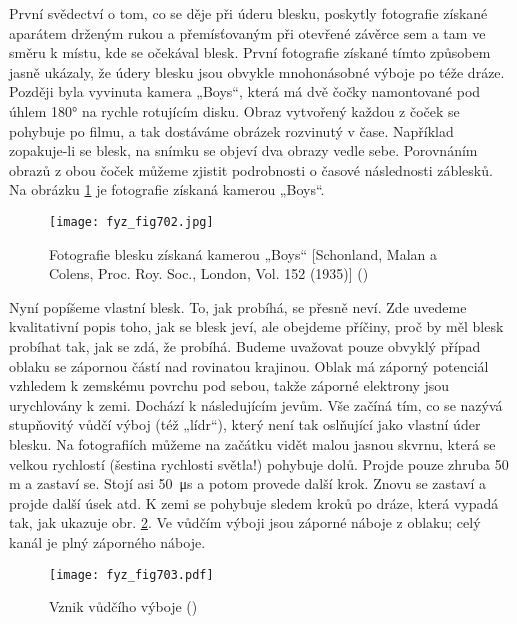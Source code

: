     První svědectví o tom, co se děje při úderu blesku, poskytly fotografie získané aparátem drženým
    rukou a přemísťovaným při otevřené závěrce sem a tam ve směru k místu, kde se očekával blesk.
    První fotografie získané tímto způsobem jasně ukázaly, že údery blesku jsou obvykle mnohonásobné
    výboje po téže dráze. Později byla vyvinuta kamera „Boys“, která má dvě čočky namontované pod
    úhlem \ang{180} na rychle rotujícím disku. Obraz vytvořený každou z čoček se pohybuje po filmu,
    a tak dostáváme obrázek rozvinutý v čase. Například zopakuje-li se blesk, na snímku se objeví
    dva obrazy vedle sebe. Porovnáním obrazů z obou čoček můžeme zjistit podrobnosti o časové
    následnosti záblesků. Na obrázku \ref{fyz:fig702} je fotografie získaná kamerou „Boys“.
  
    \begin{figure}[ht!] %
      \centering
      \texttt{[image: fyz\_fig702.jpg]}
      \caption{Fotografie blesku získaná kamerou „Boys“ [Schonland, Malan a Colens, Proc. Roy. Soc.,
               London, Vol. 152 (1935)] (\cite[s.~707]{Feynman02})}
      \label{fyz:fig702}
    \end{figure}

    Nyní popíšeme vlastní blesk. To, jak probíhá, se přesně neví. Zde uvedeme kvalitativní popis
    toho, jak se blesk jeví, ale obejdeme příčiny, proč by měl blesk probíhat tak, jak se zdá, že
    probíhá. Budeme uvažovat pouze obvyklý případ oblaku se zápornou částí nad rovinatou krajinou.
    Oblak má záporný potenciál vzhledem k zemskému povrchu pod sebou, takže záporné elektrony jsou
    urychlovány k zemi. Dochází k následujícím jevům. Vše začíná tím, co se nazývá stupňovitý vůdčí
    výboj (též „lídr“), který není tak oslňující jako vlastní úder blesku. Na fotografiích můžeme na
    začátku vidět malou jasnou skvrnu, která se velkou rychlostí (šestina rychlosti světla!)
    pohybuje dolů. Projde pouze zhruba 50 m a zastaví se. Stojí asi \SI{50}{\us} a potom provede
    další krok. Znovu se zastaví a projde další úsek atd. K zemi se pohybuje sledem kroků po dráze,
    která vypadá tak, jak ukazuje obr. \ref{fyz:fig703}. Ve vůdčím výboji jsou záporné náboje z
    oblaku; celý kanál je plný záporného náboje.


    \begin{figure}[ht!] %
      \centering
      \texttt{[image: fyz\_fig703.pdf]}
      \caption{Vznik vůdčího výboje (\cite[s.~707]{Feynman02})}
      \label{fyz:fig703}
    \end{figure}

